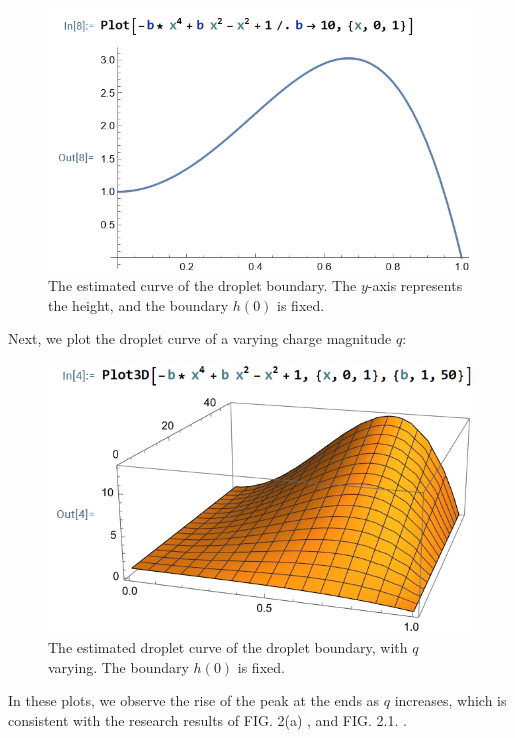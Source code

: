 \begin{figure}[H]
    \centering
    \includegraphics[width=1.\linewidth]{Figs/2d curve with q.png}
    \caption{\small The estimated curve of the droplet boundary. The $y$-axis represents the height, and the boundary $h(0)$ is fixed.}
    \label{fig:enter-label}
\end{figure}
Next, we plot the droplet curve of a varying charge magnitude $q$:
\begin{figure}[H]
    \centering
    \includegraphics[width=1.\linewidth]{Figs/curve with q.png}
    \caption{\small The estimated droplet curve of the droplet boundary, with $q$ varying. The boundary $h(0)$ is fixed.}
    \label{fig:enter-label}
\end{figure}
\noindent In these plots, we observe the rise of the peak at the ends as $q$ increases, which is consistent with the research results of FIG. 2(a) \citet{Leong2014}, and FIG. 2.1. \citet{Fontelos2008_2}.